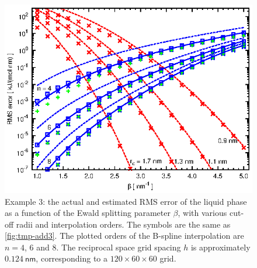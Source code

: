 \documentclass[journal=jacsat,manuscript=article]{achemso}
\begin{document}
\begin{figure}
  \centering
  \includegraphics[]{fig.order.st.eps}
  \caption{Example 3: the actual and estimated RMS error of the liquid
    phase as a function of the Ewald splitting parameter $\beta$,
    with various cut-off radii and interpolation orders.
    The symbols are the same as \ref{fig:tmp-add3}.
    The plotted orders of the B-spline interpolation are $n=4$, 6 and 8.
    The reciprocal space grid spacing $h$ is approximately
    $0.124\:\textsf{nm}$, corresponding to
    a $120\times 60\times 60$ grid.
  }
  \label{fig:tmp-add4}
\end{figure}
\end{document}
